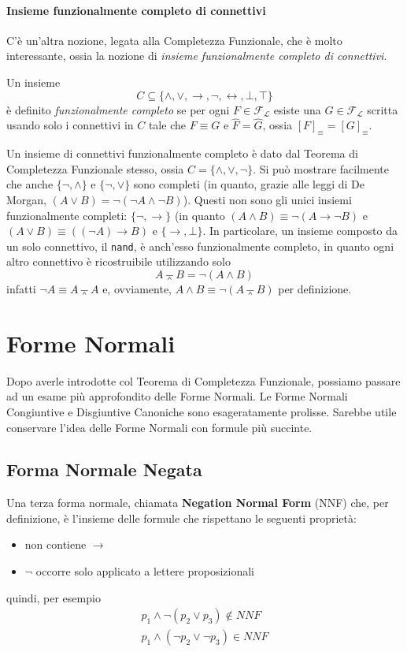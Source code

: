 \paragraph{Insieme funzionalmente completo di connettivi}
C'è un'altra nozione, legata alla Completezza Funzionale, che è molto interessante, 
ossia la nozione di \textit{insieme funzionalmente completo di connettivi}. 
\begin{defi}
Un insieme 
  $$
  C \subseteq \{\land, \lor, \rightarrow, \neg, \leftrightarrow, \bot, \top\}
  $$
è definito \textit{funzionalmente completo} se per ogni $F \in \mathscr{F_L}$ esiste una $G \in \mathscr{F_L}$ scritta usando solo i connettivi in $C$ tale che $F \equiv G$ e $\hat{F} = \hat{G}$, ossia $[F]_{\equiv} = [G]_{\equiv}$. 
\end{defi}

Un insieme di connettivi funzionalmente 
completo è dato dal Teorema di Completezza Funzionale stesso, ossia 
$C = \{\land, \lor, \neg\}$. Si può mostrare facilmente che 
anche $\{\neg, \land\}$ e $\{\neg, \lor\}$ sono completi (in quanto, grazie alle 
leggi di De Morgan, $(A \lor B) = \neg (\neg A \land \neg B)$). Questi non 
sono gli unici insiemi funzionalmente completi: 
$\{\neg, \rightarrow\}$ (in quanto $(A \land B) \equiv \neg (A \rightarrow \neg B)$ 
e $(A \lor B) \equiv ((\neg A) \rightarrow B)$ 
e $\{\rightarrow, \bot\}$. In particolare, un insieme composto da un 
solo connettivo, il \texttt{nand}, è anch'esso funzionalmente completo, 
in quanto ogni altro connettivo è ricostruibile utilizzando solo 
$$
A \barwedge B = \neg (A \land B)
$$
infatti $\neg A \equiv A \barwedge A$ e, ovviamente, $A \land B \equiv \neg ( A \barwedge B)$ 
per definizione. 

\section{Forme Normali}
Dopo averle introdotte col Teorema di Completezza Funzionale, possiamo 
passare ad un esame più approfondito delle Forme Normali.
Le Forme Normali Congiuntive e Disgiuntive Canoniche sono 
esageratamente prolisse. Sarebbe utile conservare l'idea delle Forme Normali 
con formule più succinte. 

\subsection{Forma Normale Negata}
Una terza forma normale, chiamata \textbf{Negation 
Normal Form} (NNF) che, per definizione, è l'insieme delle formule 
che rispettano le seguenti proprietà: 
\begin{itemize}
  \item non contiene $\rightarrow$ 
  \item $\neg$ occorre solo applicato a lettere proposizionali
\end{itemize}
quindi, per esempio 
\begin{align*}
p_1 \land \neg(p_2 \lor p_3) \notin NNF \\
p_1 \land (\neg p_2 \lor \neg p_3) \in NNF
\end{align*}

